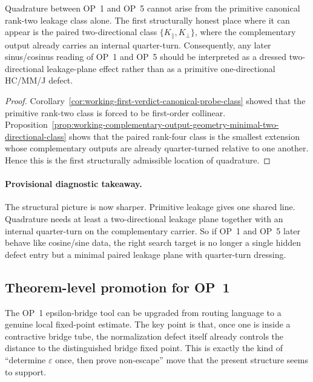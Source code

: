 \begin{corollary}
\label{cor:working-first-place-where-quadrature-becomes-possible}
Quadrature between OP~1 and OP~5 cannot arise from the primitive canonical rank-two leakage class alone. The first structurally honest place where it can appear is the paired two-directional class $\{K_{\parallel},K_{\perp}\}$, where the complementary output already carries an internal quarter-turn. Consequently, any later sinus/cosinus reading of OP~1 and OP~5 should be interpreted as a dressed two-directional leakage-plane effect rather than as a primitive one-directional HC/MM/J defect.
\end{corollary}

\begin{proof}
Corollary~\ref{cor:working-first-verdict-canonical-probe-class} showed that the primitive rank-two class is forced to be first-order collinear. Proposition~\ref{prop:working-complementary-output-geometry-minimal-two-directional-class} shows that the paired rank-four class is the smallest extension whose complementary outputs are already quarter-turned relative to one another. Hence this is the first structurally admissible location of quadrature.
\end{proof}

\paragraph{Provisional diagnostic takeaway.}
The structural picture is now sharper. Primitive leakage gives one shared line. Quadrature needs at least a two-directional leakage plane together with an internal quarter-turn on the complementary carrier. So if OP~1 and OP~5 later behave like cosine/sine data, the right search target is no longer a single hidden defect entry but a minimal paired leakage plane with quarter-turn dressing.

\subsection*{Theorem-level promotion for OP~1}
The OP~1 epsilon-bridge tool can be upgraded from routing language to a genuine local fixed-point estimate. The key point is that, once one is inside a contractive bridge tube, the normalization defect itself already controls the distance to the distinguished bridge fixed point. This is exactly the kind of ``determine \(\varepsilon\) once, then prove non-escape'' move that the present structure seems to support.


